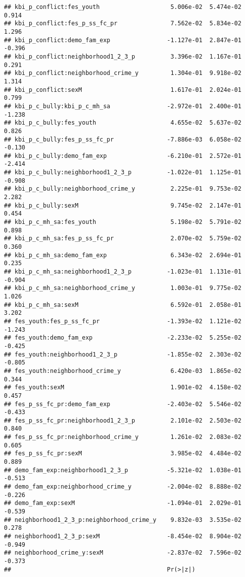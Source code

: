 \documentclass[
]{article}
\begin{document}
\begin{verbatim}
## kbi_p_conflict:fes_youth                    5.006e-02  5.474e-02   0.914
## kbi_p_conflict:fes_p_ss_fc_pr               7.562e-02  5.834e-02   1.296
## kbi_p_conflict:demo_fam_exp                -1.127e-01  2.847e-01  -0.396
## kbi_p_conflict:neighborhood1_2_3_p          3.396e-02  1.167e-01   0.291
## kbi_p_conflict:neighborhood_crime_y         1.304e-01  9.918e-02   1.314
## kbi_p_conflict:sexM                         1.617e-01  2.024e-01   0.799
## kbi_p_c_bully:kbi_p_c_mh_sa                -2.972e-01  2.400e-01  -1.238
## kbi_p_c_bully:fes_youth                     4.655e-02  5.637e-02   0.826
## kbi_p_c_bully:fes_p_ss_fc_pr               -7.886e-03  6.058e-02  -0.130
## kbi_p_c_bully:demo_fam_exp                 -6.210e-01  2.572e-01  -2.414
## kbi_p_c_bully:neighborhood1_2_3_p          -1.022e-01  1.125e-01  -0.908
## kbi_p_c_bully:neighborhood_crime_y          2.225e-01  9.753e-02   2.282
## kbi_p_c_bully:sexM                          9.745e-02  2.147e-01   0.454
## kbi_p_c_mh_sa:fes_youth                     5.198e-02  5.791e-02   0.898
## kbi_p_c_mh_sa:fes_p_ss_fc_pr                2.070e-02  5.759e-02   0.360
## kbi_p_c_mh_sa:demo_fam_exp                  6.343e-02  2.694e-01   0.235
## kbi_p_c_mh_sa:neighborhood1_2_3_p          -1.023e-01  1.131e-01  -0.904
## kbi_p_c_mh_sa:neighborhood_crime_y          1.003e-01  9.775e-02   1.026
## kbi_p_c_mh_sa:sexM                          6.592e-01  2.058e-01   3.202
## fes_youth:fes_p_ss_fc_pr                   -1.393e-02  1.121e-02  -1.243
## fes_youth:demo_fam_exp                     -2.233e-02  5.255e-02  -0.425
## fes_youth:neighborhood1_2_3_p              -1.855e-02  2.303e-02  -0.805
## fes_youth:neighborhood_crime_y              6.420e-03  1.865e-02   0.344
## fes_youth:sexM                              1.901e-02  4.158e-02   0.457
## fes_p_ss_fc_pr:demo_fam_exp                -2.403e-02  5.546e-02  -0.433
## fes_p_ss_fc_pr:neighborhood1_2_3_p          2.101e-02  2.503e-02   0.840
## fes_p_ss_fc_pr:neighborhood_crime_y         1.261e-02  2.083e-02   0.605
## fes_p_ss_fc_pr:sexM                         3.985e-02  4.484e-02   0.889
## demo_fam_exp:neighborhood1_2_3_p           -5.321e-02  1.038e-01  -0.513
## demo_fam_exp:neighborhood_crime_y          -2.004e-02  8.888e-02  -0.226
## demo_fam_exp:sexM                          -1.094e-01  2.029e-01  -0.539
## neighborhood1_2_3_p:neighborhood_crime_y    9.832e-03  3.535e-02   0.278
## neighborhood1_2_3_p:sexM                   -8.454e-02  8.904e-02  -0.949
## neighborhood_crime_y:sexM                  -2.837e-02  7.596e-02  -0.373
##                                            Pr(>|z|)    

\end{verbatim}
\end{document}

